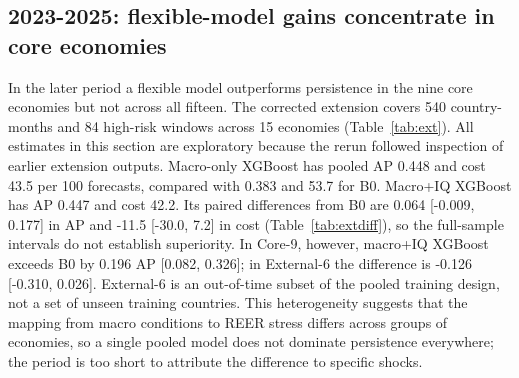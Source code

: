 \documentclass[preprint,12pt,authoryear]{elsarticle}
\begin{document}
\subsection{2023-2025: flexible-model gains concentrate in core economies}
In the later period a flexible model outperforms persistence in the nine core economies but not across all fifteen. The corrected extension covers 540 country-months and 84 high-risk windows across 15 economies (Table~\ref{tab:ext}). All estimates in this section are exploratory because the rerun followed inspection of earlier extension outputs. Macro-only XGBoost has pooled AP 0.448 and cost 43.5 per 100 forecasts, compared with 0.383 and 53.7 for B0. Macro+IQ XGBoost has AP 0.447 and cost 42.2. Its paired differences from B0 are 0.064 [-0.009, 0.177] in AP and -11.5 [-30.0, 7.2] in cost (Table~\ref{tab:extdiff}), so the full-sample intervals do not establish superiority. In Core-9, however, macro+IQ XGBoost exceeds B0 by 0.196 AP [0.082, 0.326]; in External-6 the difference is -0.126 [-0.310, 0.026]. External-6 is an out-of-time subset of the pooled training design, not a set of unseen training countries. This heterogeneity suggests that the mapping from macro conditions to REER stress differs across groups of economies, so a single pooled model does not dominate persistence everywhere; the period is too short to attribute the difference to specific shocks.
\end{document}
